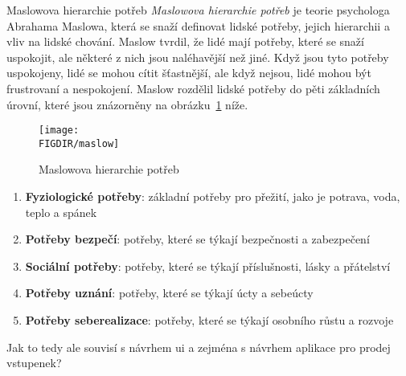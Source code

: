 \begin{subsection}{Maslowova hierarchie potřeb}
    \label{subsec:navrh-uzivatelskeho-rozhrani-psychologie-maslow}
    \textit{Maslowova hierarchie potřeb} je teorie psychologa Abrahama Maslowa, která se snaží definovat lidské potřeby, jejich hierarchii a vliv na lidské chování.
    Maslow tvrdil, že lidé mají potřeby, které se snaží uspokojit, ale některé z nich jsou naléhavější než jiné.
    Když jsou tyto potřeby uspokojeny, lidé se mohou cítit šťastnější, ale když nejsou, lidé mohou být frustrovaní a nespokojení.\cite{maslow_motivace_osobnost}
    Maslow rozdělil lidské potřeby do pěti základních úrovní, které jsou znázorněny na obrázku~\ref{fig:maslow} níže.

    \begin{figure}[H]
        \centering
        \texttt{[image: \\FIGDIR/maslow]}
        \caption{Maslowova hierarchie potřeb\cite{wiki_potreby}}
        \label{fig:maslow}
    \end{figure}

    \begin{enumerate}
        \item \textbf{Fyziologické potřeby}: základní potřeby pro přežití, jako je potrava, voda, teplo a spánek
        \item \textbf{Potřeby bezpečí}: potřeby, které se týkají bezpečnosti a zabezpečení
        \item \textbf{Sociální potřeby}: potřeby, které se týkají příslušnosti, lásky a přátelství
        \item \textbf{Potřeby uznání}: potřeby, které se týkají úcty a sebeúcty
        \item \textbf{Potřeby seberealizace}: potřeby, které se týkají osobního růstu a rozvoje
    \end{enumerate}

    Jak to tedy ale souvisí s návrhem \ac{ui} a zejména s návrhem aplikace pro prodej vstupenek?
\end{subsection}

